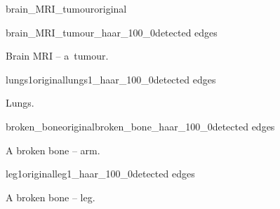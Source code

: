 \begin{figure}[h]
	\centering
	\begin{subdiagram}{brain_MRI_tumour}{original}
	\end{subdiagram}
	
	\begin{subdiagram}{brain_MRI_tumour_haar_100_0}{detected edges}
	\end{subdiagram}
	
	\caption{Brain MRI -- a~tumour.}
	\label{fig:brain1}
\end{figure}


\begin{figure}[h]
	\centering
	\begin{mainsubdiagrams2}{lungs1}{original}{lungs1_haar_100_0}{detected edges}
	\end{mainsubdiagrams2}
	
	\caption{Lungs.}
	\label{fig:lungs}
\end{figure}


\begin{figure}[h]
	\centering
	\begin{mainsubdiagrams2}{broken_bone}{original}{broken_bone_haar_100_0}{detected edges}
	\end{mainsubdiagrams2}
	
	\caption{A broken bone -- arm.}
	\label{fig:arm}
\end{figure}

\begin{figure}[h]
	\centering
	\begin{mainsubdiagrams2}{leg1}{original}{leg1_haar_100_0}{detected edges}
	\end{mainsubdiagrams2}
	
	\caption{A broken bone -- leg.}
	\label{fig:leg}
\end{figure}
